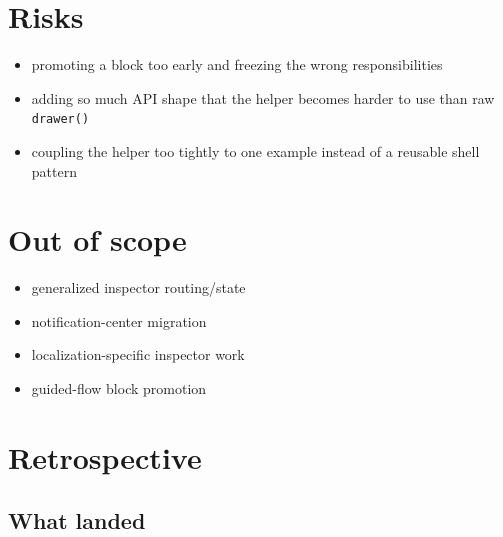 \section{Risks}\label{record-174-risks}

\begin{itemize}
\tightlist
\item
  promoting a block too early and freezing the wrong responsibilities
\item
  adding so much API shape that the helper becomes harder to use than raw \texttt{d\allowbreak{}r\allowbreak{}a\allowbreak{}w\allowbreak{}e\allowbreak{}r\allowbreak{}(\allowbreak{})}
\item
  coupling the helper too tightly to one example instead of a reusable shell pattern
\end{itemize}

\section{Out of scope}\label{record-174-out-of-scope}

\begin{itemize}
\tightlist
\item
  generalized inspector routing/state
\item
  notification-center migration
\item
  localization-specific inspector work
\item
  guided-flow block promotion
\end{itemize}

\section{Retrospective}\label{record-174-retrospective}

\subsection{What landed}\label{record-174-what-landed}

